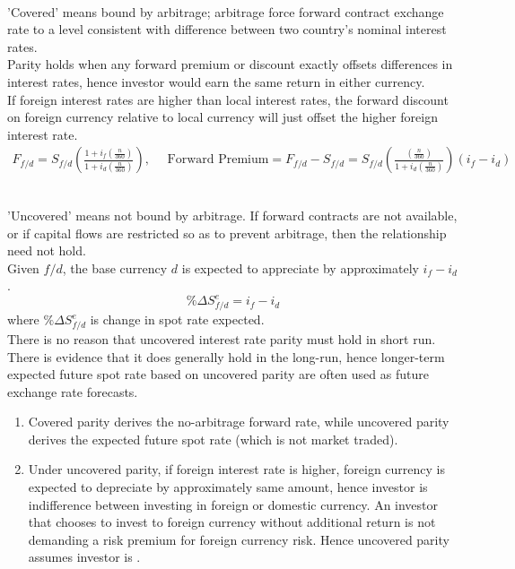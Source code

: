 \begin{definition} \\
'Covered' means bound by arbitrage; arbitrage force forward contract exchange rate to a level consistent with difference between two country's nominal interest rates.\\
Parity holds when any forward premium or discount exactly offsets differences in interest rates, hence investor would earn the same return in either currency.\\
If foreign interest rates are higher than local interest rates, the forward discount on foreign currency relative to local currency will just offset the higher foreign interest rate.
\begin{align}
F_{f/d} = S_{f/d} \left( \frac{1 + i_f (\frac{n}{360})}{1 + i_d (\frac{n}{360})} \right), \ \ \ \ \ \  \text{Forward Premium} = F_{f/d} -  S_{f/d} = S_{f/d} \left( \frac{(\frac{n}{360})}{1 + i_d (\frac{n}{360})} \right) (i_f - i_d) \nonumber
\end{align}
\end{definition}

\begin{definition} \\
'Uncovered' means not bound by arbitrage. If forward contracts are not available, or if capital flows are restricted so as to prevent arbitrage, then the relationship need not hold.\\
Given $f/d$, the base currency $d$ is expected to appreciate by approximately $i_f - i_d$.
\begin{equation}
\% \Delta S^e_{f/d} = i_f - i_d \nonumber
\end{equation}
where $\% \Delta S^e_{f/d}$ is change in spot rate expected.\\
There is no reason that uncovered interest rate parity must hold in short run.\\
There is evidence that it does generally hold in the long-run, hence longer-term expected future spot rate based on uncovered parity are often used as future exchange rate forecasts.
\end{definition}

\begin{remark} 
\begin{enumerate}[label=\roman*.]
\setlength{\itemsep}{0pt}
\item Covered parity derives the no-arbitrage forward rate, while uncovered parity derives the expected future spot rate (which is not market traded).
\item Under uncovered parity, if foreign interest rate is higher, foreign currency is expected to depreciate by approximately same amount, hence investor is indifference between investing in foreign or domestic currency. An investor that chooses to invest to foreign currency without additional return is not demanding a risk premium for foreign currency risk. Hence uncovered parity assumes investor is .
\end{enumerate}
\end{remark}

